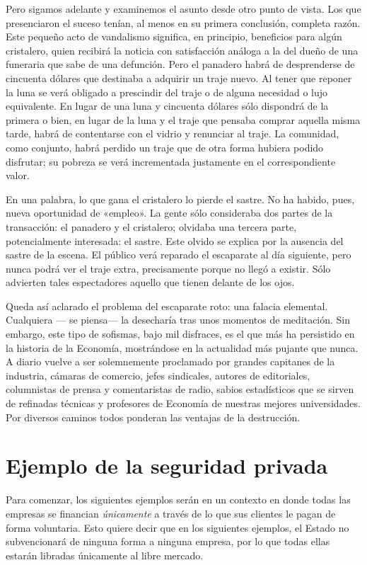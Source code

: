 \documentclass[12pt,a4paper,twoside]{book}
\begin{document}
Pero sigamos adelante y examinemos el asunto desde otro punto de vista. Los que presenciaron el suceso tenían, al menos en su primera conclusión, completa razón. Este pequeño acto de vandalismo significa, en principio, beneficios para algún cristalero, quien recibirá la noticia con satisfacción análoga a la del dueño de una funeraria que sabe de una defunción. Pero el panadero habrá de desprenderse de cincuenta dólares que destinaba a adquirir un traje nuevo. Al tener que reponer la luna se verá obligado a prescindir del traje o de alguna necesidad o lujo equivalente. En lugar de una luna y cincuenta dólares sólo dispondrá de la primera o bien, en lugar de la luna y el traje que pensaba comprar aquella misma tarde, habrá de contentarse con el vidrio y renunciar al traje. La comunidad, como conjunto, habrá perdido un traje que de otra forma hubiera podido disfrutar; su pobreza se verá incrementada justamente en el correspondiente valor.

En una palabra, lo que gana el cristalero lo pierde el sastre. No ha habido, pues, nueva oportunidad de «empleo». La gente sólo consideraba dos partes de la transacción: el panadero y el cristalero; olvidaba una tercera parte, potencialmente interesada: el sastre. Este olvido se explica por la ausencia del sastre de la escena. El público verá reparado el escaparate al día siguiente, pero nunca podrá ver el traje extra, precisamente porque no llegó a existir. Sólo advierten tales espectadores aquello que tienen delante de los ojos.

Queda así aclarado el problema del escaparate roto: una falacia elemental. Cualquiera — se piensa— la desecharía tras unos momentos de meditación. Sin embargo, este tipo de sofismas, bajo mil disfraces, es el que más ha persistido en la historia de la Economía, mostrándose en la actualidad más pujante que nunca. A diario vuelve a ser solemnemente proclamado por grandes capitanes de la industria, cámaras de comercio, jefes sindicales, autores de editoriales, columnistas de prensa y comentaristas de radio, sabios estadísticos que se sirven de refinadas técnicas y profesores de Economía de nuestras mejores universidades. Por diversos caminos todos ponderan las ventajas de la destrucción. \cite[pág. 9]{hazlitt:econo1lec}

\section{Ejemplo de la seguridad privada}
Para comenzar, los siguientes ejemplos serán en un contexto en donde todas las empresas se financian \textit{únicamente} a través de lo que sus clientes le pagan de forma voluntaria. Esto quiere decir que en los siguientes ejemplos, el Estado no subvencionará de ninguna forma a ninguna empresa, por lo que todas ellas estarán libradas únicamente al libre mercado.
\end{document}
